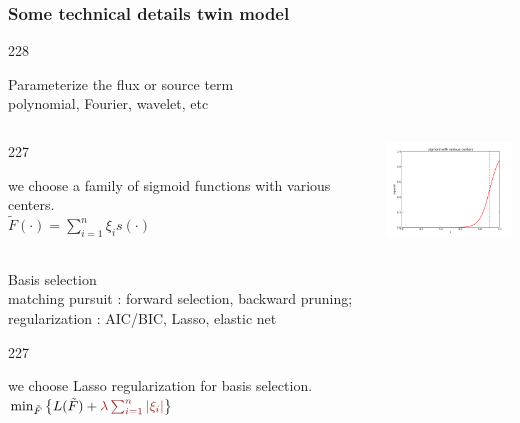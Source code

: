 \documentclass{beamer}
\let\oldcite=\cite
\renewcommand{\cite}[1]{\textcolor[rgb]{.4,.4,.85}{\oldcite{#1}}}
\newcommand{\barrow}{\item[\color{darkred}\ding{228}]}
\newcommand{\carrow}{\item[\color{darkred}\ding{227}]}
\begin{document}
\setcounter{framenumber}{9}

\begin{frame}
    \frametitle{Some technical details \hfill \scriptsize{twin model}}\small
    \begin{dinglist}{228}
        \barrow Parameterize the flux or source term \\\vspace{.05cm} \scriptsize polynomial, Fourier, wavelet, etc\\
        \small
        \vspace{-.3cm}
        \begin{columns}
            \begin{dinglist}{227}
                \carrow we choose a family of sigmoid functions with various centers.\\\scriptsize
                        $
                            \tilde{F}(\cdot) = \sum_{i=1}^n \xi_i s(\cdot)
                        $
            \end{dinglist}
            \small
            \includegraphics[width=3.5cm]{sigmoid_5.png}
        \end{columns}
        \barrow Basis selection\\\vspace{.05cm}
            \scriptsize matching pursuit \cite{Adler 96, Billing07}: forward selection, backward pruning;\\
            regularization \cite{Stone 77, Schwarz 78, Tibshirani 96}: AIC/BIC, Lasso, elastic net
            \small\vspace{.16cm}
            \begin{dinglist}{227}
                \carrow we choose Lasso regularization for basis selection.\scriptsize\\
                $
                    \min_{\tilde{F}} \left\{ L(\tilde{F})+\textcolor{darkred}{\lambda\sum_{i=1}^n\left| \xi_i \right|}\right\}
                $
            \end{dinglist}
    \end{dinglist}
\end{frame}
\end{document}
